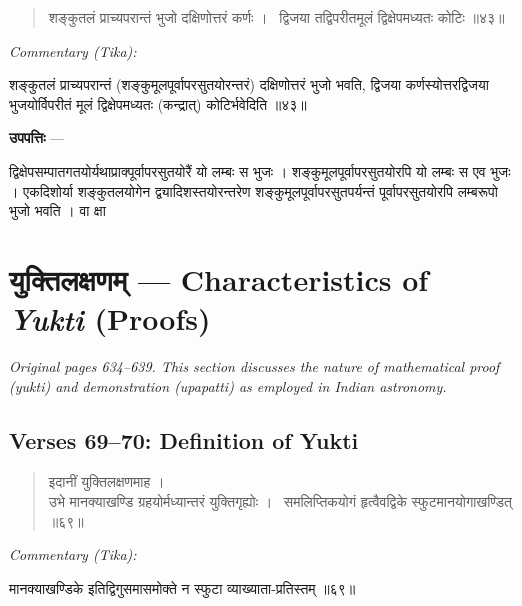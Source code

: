 \documentclass[11pt,a4paper]{article}
\newcommand{\dev}[1]{{\devanagarifont #1}}
\newcommand{\skt}[1]{{\devanagarifont\color{sktcolor} #1}}
\newenvironment{shloka}{%
  \begin{quote}%
  \smallskip%
  \devanagarifont\color{sktcolor}%
}{%
  \smallskip%
  \end{quote}%
}
\newenvironment{tika}{%
  \smallskip%
  \noindent\textit{Commentary (Tika):}\par%
  \smallskip%
  \hindifont\small%
}{%
  \par\smallskip%
}
\newenvironment{upapatti}{%
  \smallskip%
  \noindent\textbf{\devanagarifont उपपत्तिः} — \devanagarifont\small%
}{%
  \par\smallskip%
}
\newcommand{\ednote}[1]{\textcolor{notecolor}{\textit{#1}}}
\begin{document}
\begin{shloka}
\skt{शङ्कुतलं प्राच्यपरान्तं भुजो दक्षिणोत्तरं कर्णः ।}\
\skt{द्विजया तद्विपरीतमूलं द्विक्षेपमध्यतः कोटिः} ॥४३॥
\end{shloka}

\vspace{0.3cm}
\begin{tika}
\skt{शङ्कुतलं प्राच्यपरान्तं} (शङ्कुमूलपूर्वापरसुतयोरन्तरं) दक्षिणोत्तरं भुजो भवति, द्विजया कर्णस्योत्तरद्विजया भुजयोर्विपरीतं मूलं द्विक्षेपमध्यतः (कन्द्रात्) कोटिर्भवेदिति ॥४३॥
\end{tika}

\vspace{0.5cm}

\begin{upapatti}
\skt{द्विक्षेपसम्पातगतयोर्यथाप्राक्पूर्वापरसुतयोरैं यो लम्बः स भुजः} । शङ्कुमूलपूर्वापरसुतयोरपि यो लम्बः स एव भुजः । एकदिशोर्या शङ्कुतलयोगेन द्व्यादिशस्तयोरन्तरेण शङ्कुमूलपूर्वापरसुतपर्यन्तं पूर्वापरसुतयोरपि लम्बरूपो भुजो भवति । वा क्षा
\end{upapatti}

\newpage
\section[युक्तिलक्षणम्]{\dev{युक्तिलक्षणम्} — Characteristics of \textit{Yukti} (Proofs)}
\label{sec:yukti}

\ednote{Original pages 634--639. This section discusses the nature of mathematical proof (yukti) and demonstration (upapatti) as employed in Indian astronomy.}

\subsection*{Verses 69--70: Definition of Yukti}

\begin{shloka}
इदानीं युक्तिलक्षणमाह ।\\[0.5em]
\skt{उभे मानक्याखण्डि ग्रहयोर्मध्यान्तरं युक्तिगृह्योः ।}\
\skt{समलिप्तिकयोगं हृत्वैवद्विके स्फुटमानयोगाखण्डित्} ॥६९॥
\end{shloka}

\vspace{0.3cm}
\begin{tika}
\skt{मानक्याखण्डिके} इतिद्विगुसमासमोक्ते न स्फुटा व्याख्याता-प्रतिस्तम् ॥६९॥
\end{tika}
\end{document}
